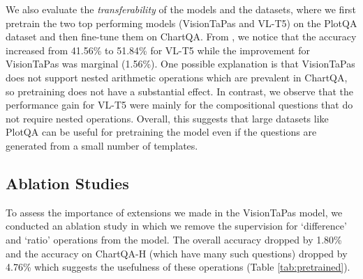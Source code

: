 We also evaluate the \emph{transferability} of the models and the datasets, where we first pretrain the two top performing models (VisionTaPas and VL-T5) on the PlotQA dataset and then fine-tune them on ChartQA. From 
, we notice that the accuracy increased from 41.56\% to 51.84\% for VL-T5 while the improvement for VisionTaPas was marginal (1.56\%). One possible explanation is that VisionTaPas does not support nested arithmetic operations which are prevalent in ChartQA, so pretraining does not have a substantial effect. In contrast,  
we observe that the performance gain for VL-T5 were mainly for the compositional questions that do not require nested operations.
Overall, this suggests that large
datasets like PlotQA can be 
useful for pretraining the model even if the questions are generated from a small number of templates. 


 





\subsection{Ablation Studies}
To assess the importance of extensions we made in the VisionTaPas model, we conducted an ablation study in which we remove the supervision for `difference' and `ratio' operations  from the 
model. 
The overall accuracy dropped 
by 1.80\%
and the accuracy on ChartQA-H (which have many such questions) dropped 
by 4.76\%
which suggests the usefulness of these operations (Table \ref{tab:pretrained}).




